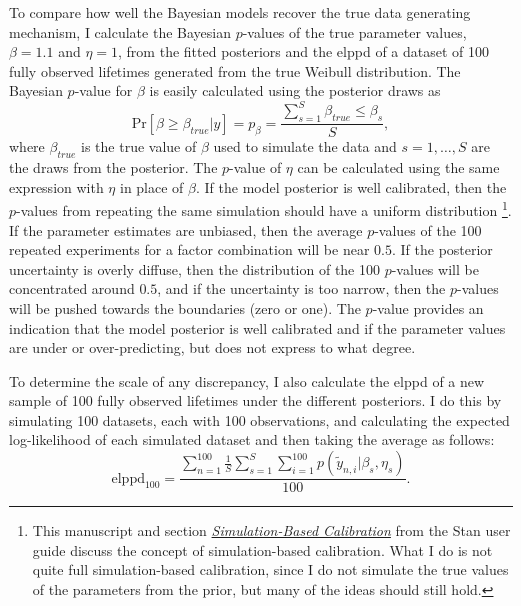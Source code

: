 To compare how well the Bayesian models recover the true data generating mechanism, I calculate the Bayesian $p$-values of the true parameter values, $\beta = 1.1$ and $\eta = 1$, from the fitted posteriors and the elppd of a dataset of 100 fully observed lifetimes generated from the true Weibull distribution. The Bayesian $p$-value for $\beta$ is easily calculated using the posterior draws as \citep[Sec.~6.4]{BDA2020}
\begin{equation*}
    \text{Pr}\left[\beta \ge \beta_{true}|y\right] = p_{\beta} = \frac{\sum^{S}_{s = 1}{\beta_{true} \le \beta_s}}{S},
\end{equation*}
where $\beta_{true}$ is the true value of $\beta$ used to simulate the data and $s = {1,\dots, S}$ are the draws from the posterior. The $p$-value of $\eta$ can be calculated using the same expression with $\eta$ in place of $\beta$. If the model posterior is well calibrated, then the $p$-values from repeating the same simulation should have a uniform distribution \citep{talts2020, stan_user_guide2024}\footnote{This manuscript and section \href{https://mc-stan.org/docs/stan-users-guide/simulation-based-calibration.html}{\textit{Simulation-Based Calibration}} from the Stan user guide discuss the concept of simulation-based calibration. What I do is not quite full simulation-based calibration, since I do not simulate the true values of the parameters from the prior, but many of the ideas should still hold.}. If the parameter estimates are unbiased, then the average $p$-values of the 100 repeated experiments for a factor combination will be near $0.5$. If the posterior uncertainty is overly diffuse, then the distribution of the 100 $p$-values will be concentrated around $0.5$, and if the uncertainty is too narrow, then the $p$-values will be pushed towards the boundaries (zero or one). The $p$-value provides an indication that the model posterior is well calibrated and if the parameter values are under or over-predicting, but does not express to what degree.

To determine the scale of any discrepancy, I also calculate the elppd of a new sample of 100 fully observed lifetimes under the different posteriors. I do this by simulating 100 datasets, each with 100 observations, and calculating the expected log-likelihood of each simulated dataset and then taking the average as follows:
\begin{equation*}
    \label{eq:elppd-100}
    \text{elppd}_{100} = \frac{\sum_{n = 1}^{100}\frac{1}{S}\sum_{s = 1}^{S}\sum_{i = 1}^{100}p(\tilde{y}_{n, i}|\beta_s, \eta_s)}{100}.
\end{equation*}

